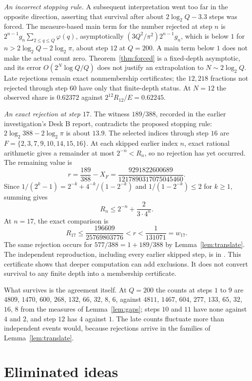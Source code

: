 \documentclass[11pt]{article}
\begin{document}
\emph{An incorrect stopping rule.}  A subsequent interpretation went too far
in the opposite direction, asserting that survival after about $2\log_2Q-3.3$
steps was forced.  The measure-based main term for the number rejected at step $n$ is
$2^{n-1}g_n\sum_{2\le q\le Q}\varphi(q)$, asymptotically
$(3Q^2/\pi^2)2^{n-1}g_n$, which is below $1$ for $n>2\log_2Q-2\log_2\pi$, about
step $12$ at $Q=200$.  A main term below $1$ does not make the actual count
zero.  Theorem~\ref{thm:forced} is a fixed-depth asymptotic, and its error
$O(2^N\log Q/Q)$ does not justify an extrapolation to $N\sim2\log_2Q$.
Late rejections remain exact nonmembership certificates; the $12{,}218$
fractions not rejected through step $60$ have only that finite-depth status.
At $N=12$ the observed share is $0.62372$ against
$2^{12}R_{12}/E=0.62245$.

\emph{An exact rejection at step $17$.}  The witness $189/388$, recorded in the
earlier investigation's Desk B report, contradicts the proposed stopping rule:
$2\log_2 388-2\log_2\pi$ is about $13.9$.  The selected indices through step $16$
are $F=\{2,3,7,9,10,14,15,16\}$.  At each skipped earlier index $n$, exact
rational arithmetic gives a remainder at most $2^{-n}<R_n$, so no rejection
has yet occurred.  The remaining value is
\[
 r=\frac{189}{388}-X_F
  =\frac{9291822600689}{1217890317075045460}.
\]
Since $1/(2^k-1)=2^{-k}+4^{-k}/(1-2^{-k})$ and
$1/(1-2^{-k})\le2$ for $k\ge1$, summing gives
\[
 R_n\le2^{-n}+\frac{2}{3\cdot4^n}.
\]
At $n=17$, the exact comparison is
\[
 R_{17}\le\frac{196609}{25769803776}<r<\frac1{131071}=w_{17}.
\]
The same rejection occurs for $577/388=1+189/388$ by
Lemma~\ref{lem:translate}.  The independent reproduction, including every
earlier skipped step, is in
.
This certificate shows that deeper computation can add exclusions.  It does
not convert survival to any finite depth into a membership certificate.

What survives is the agreement itself.  At $Q=200$ the counts at steps $1$ to
$9$ are $4809$, $1470$, $600$, $268$, $132$, $66$, $32$, $8$, $6$, against
$4811$, $1467$, $604$, $277$, $133$, $65$, $32$, $16$, $8$ from the measures of
Lemma~\ref{lem:gaps}; steps $10$ and $11$ have none against $4$ and $2$, and
step $12$ has $4$ against $1$.  The late counts fluctuate more than independent
events would, because rejections arrive in the families of
Lemma~\ref{lem:translate}.

\section{Eliminated ideas}\label{sec:eliminated}
\end{document}
